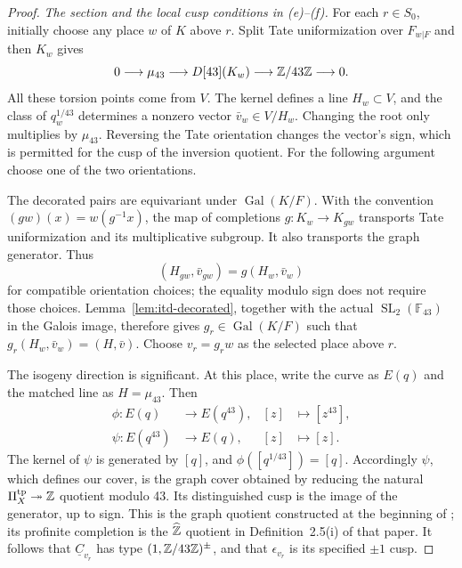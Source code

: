 \begin{proof}
\smallskip\noindent
\emph{The section and the local cusp conditions in (e)--(f).}
For each $r\in S_0$, initially choose any place $w$ of $K$ above
$r$. Split Tate uniformization over $F_{w|F}$ and then $K_w$
gives
\begin{equation}\label{eq:itd-tate-sequence}
 0\longrightarrow\mu_{43}
 \longrightarrow D[43](K_w)
 \longrightarrow\mathbb Z/43\mathbb Z\longrightarrow0.
\end{equation}
All these torsion points come from $V$. The kernel defines a
line $H_w\subset V$, and the class of $q_w^{1/43}$ determines
a nonzero vector $\bar v_w\in V/H_w$. Changing the root only
multiplies by $\mu_{43}$. Reversing the Tate orientation changes
the vector's sign, which is permitted for the cusp of the
inversion quotient. For the following argument choose one of the
two orientations.

The decorated pairs are equivariant under
$\operatorname{Gal}(K/F)$. With the convention
$(gw)(x)=w(g^{-1}x)$, the map of completions
$g:K_w\to K_{gw}$ transports Tate uniformization and its
multiplicative subgroup. It also transports the graph generator.
Thus
\begin{equation}\label{eq:itd-place-action}
 (H_{gw},\bar v_{gw})=g(H_w,\bar v_w)
\end{equation}
for compatible orientation choices; the equality modulo sign does
not require those choices.
Lemma~\ref{lem:itd-decorated}, together with the actual
$\operatorname{SL}_2(\mathbb F_{43})$ in the Galois image,
therefore gives $g_r\in\operatorname{Gal}(K/F)$ such that
$g_r(H_w,\bar v_w)=(H,\bar v)$. Choose $v_r=g_rw$ as the
selected place above $r$.

The isogeny direction is significant. At this place, write the
curve as $E(q)$ and the matched line as $H=\mu_{43}$. Then
\begin{equation}\label{eq:itd-tate-isogenies}
 \begin{aligned}
  \phi:E(q)&\longrightarrow E(q^{43}),&
           [z]&\longmapsto[z^{43}],\\
  \psi:E(q^{43})&\longrightarrow E(q),&
           [z]&\longmapsto[z].
 \end{aligned}
\end{equation}
The kernel of $\psi$ is generated by $[q]$, and
$\phi([q^{1/43}])=[q]$. Accordingly $\psi$, which defines our
cover, is the graph cover obtained by reducing the natural
$\Pi_X^{\rm tp}\twoheadrightarrow\mathbb Z$ quotient modulo 43.
Its distinguished cusp is the image of the generator, up to sign.
This is the graph quotient constructed at the beginning of
\cite[Section~1]{MochEtaleTheta}; its profinite completion is the
$\widehat{\mathbb Z}$ quotient in Definition~2.5(i) of that paper.
It follows that $\underline C_{v_r}$ has type
$(1,\mathbb Z/43\mathbb Z)^\pm$, and that $\epsilon_{v_r}$ is its
specified $\pm1$ cusp.


\end{proof}
